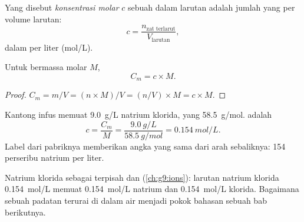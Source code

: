 \begin{definition}\label{def:g10:concentration-and-dilution:molar-concentration}
Yang disebut \emph{konsentrasi molar} $c$
sebuah  dalam larutan adalah jumlah  yang 
per volume larutan:
\[
  c = \frac{n_{\text{zat terlarut}}}{V_{\text{larutan}}},
\]
dalam  per liter (\si{mol/L}).
\end{definition}

\begin{proposition}\label{prop:g10:concentration-and-dilution:link}
Untuk  bermassa molar $M$,
\[
  C_m = c \times M .
\]
\end{proposition}

\begin{proof}
$C_m = m / V = (n \times M) / V = (n / V) \times M = c \times M$.
\end{proof}

\begin{example}\label{ex:g10:concentration-and-dilution:drip}
Kantong infus memuat \qty{9.0}{g/L} natrium klorida, yang  \qty{58.5}{g/mol}.  adalah
\[
  c = \frac{C_m}{M} = \frac{\qty{9.0}{g/L}}{\qty{58.5}{g/mol}}
    = \qty{0.154}{mol/L}.
\]
Label dari pabriknya memberikan angka yang sama dari arah sebaliknya:
154 perseribu   natrium per liter.
\end{example}

\begin{remark}\label{rem:g10:concentration-and-dilution:ions}
Natrium klorida  sebagai  terpisah  dan 
(\cref{ch:g9:ions}): larutan natrium klorida \qty{0.154}{mol/L} memuat
\qty{0.154}{mol/L}  natrium dan \qty{0.154}{mol/L}  klorida.
Bagaimana sebuah padatan  terurai di dalam air menjadi pokok bahasan
sebuah bab berikutnya.
\end{remark}

